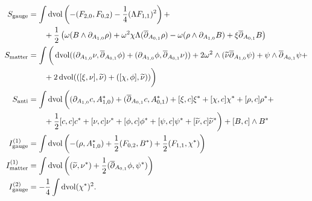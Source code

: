 \documentclass[10pt, oneside]{article}
\newcommand{\gauge}{\mathrm{gauge}}
\newcommand{\matter}{\mathrm{matter}}
\begin{document}
\begin{align*}
S_{\gauge} &= \int \dvol \left(-(F_{2, 0}, F_{0, 2}) - \frac{1}{4}(\Lambda F_{1, 1})^2\right) + \\
&\qquad + \frac 12 \left( \omega(B \wedge \dd_{A_{1,0}} \rho) + \omega^2\chi\Lambda(\ol \dd_{A_{0,1}} \rho) - \omega(\rho \wedge \dd_{A_{1,0}} B) + \xi \ol \dd_{A_{0,1}} B \right)  \\
S_{\matter} &= \int \bigg( \dvol ((\dd_{A_{1,0}}\nu, \ol \dd_{A_{0,1}} \phi) + (\dd_{A_{1,0}}\phi, \ol \dd_{A_{0,1}} \nu)) + 2\omega^2\wedge(\wt\nu \ol \dd_{A_{1,0}} \psi) + \psi \wedge \ol \dd_{A_{0,1}} \psi + \\
&\qquad + 2\dvol(([\xi,\nu],\wt\nu) + ([\chi, \phi], \wt\nu) )   \bigg) \\
S_{\mr{anti}} &= \int \dvol \bigg( (\dd_{A_{1, 0}} c, A_{1, 0}^*) + (\ol\dd_{A_{0, 1}} c, A_{0, 1}^*)  +  [\xi, c] \xi^* + [\chi, c]\chi^* +[\rho, c] \rho^* + \\
&\qquad + \frac{1}{2}[c, c]c^* + [\nu, c] \nu^* + [\phi, c] \phi^* + [\psi, c] \psi^* + [\wt\nu, c] \wt\nu^* \bigg) + [B, c]\wedge B^* \\
I^{(1)}_{\gauge} &=  \int \dvol \left( - (\rho, A_{1,0}^*) + \frac 12 (F_{0,2},B^*) + \frac 12 (F_{1,1}, \chi^*)  \right)\\
I^{(1)}_{\matter} &=  \int \dvol \left( (\wt\nu, \nu^*) + \frac 12( \ol \dd_{A_{0,1}} \phi, \psi^*) \right)\\
I^{(2)}_{\gauge} &= -\frac{1}{4}\int \dvol (\chi^*)^2.
\end{align*}
\end{document}
